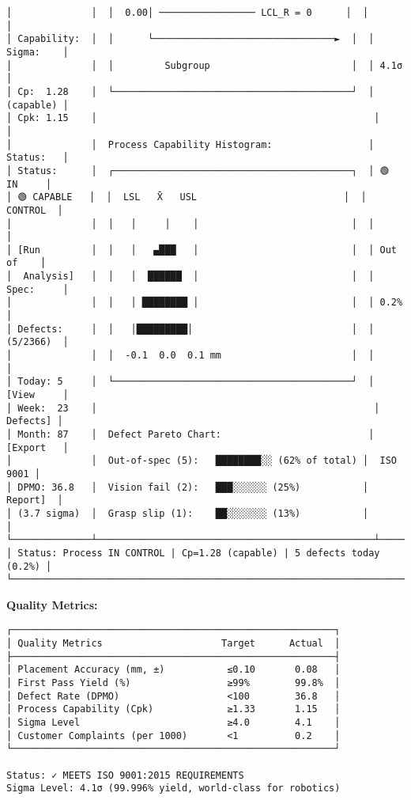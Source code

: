 \documentclass[
]{article}
\begin{document}
\begin{verbatim}
│              │  │  0.00│ ───────────────── LCL_R = 0      │  │           │
│ Capability:  │  │      └────────────────────────────────►  │  │ Sigma:    │
│              │  │         Subgroup                         │  │ 4.1σ      │
│ Cp:  1.28    │  └──────────────────────────────────────────┘  │ (capable) │
│ Cpk: 1.15    │                                                 │           │
│              │  Process Capability Histogram:                 │ Status:   │
│ Status:      │  ┌──────────────────────────────────────────┐  │ 🟢 IN     │
│ 🟢 CAPABLE   │  │  LSL   X̄   USL                          │  │  CONTROL  │
│              │  │   │     │    │                           │  │           │
│ [Run         │  │   │   ▄███   │                           │  │ Out of    │
│  Analysis]   │  │   │  ██████  │                           │  │ Spec:     │
│              │  │   │ ████████ │                           │  │ 0.2%      │
│ Defects:     │  │   │█████████│                            │  │ (5/2366)  │
│              │  │  -0.1  0.0  0.1 mm                       │  │           │
│ Today: 5     │  └──────────────────────────────────────────┘  │ [View     │
│ Week:  23    │                                                 │  Defects] │
│ Month: 87    │  Defect Pareto Chart:                          │ [Export   │
│              │  Out-of-spec (5):   ████████░░ (62% of total) │  ISO 9001 │
│ DPMO: 36.8   │  Vision fail (2):   ███░░░░░░ (25%)           │  Report]  │
│ (3.7 sigma)  │  Grasp slip (1):    ██░░░░░░░ (13%)           │           │
└──────────────┴─────────────────────────────────────────────────┴───────────┘
│ Status: Process IN CONTROL | Cp=1.28 (capable) | 5 defects today (0.2%) │
└────────────────────────────────────────────────────────────────────────────┘
\end{verbatim}

\textbf{Quality Metrics:}

\begin{verbatim}
┌─────────────────────────────────────────────────────────┐
│ Quality Metrics                     Target      Actual  │
├─────────────────────────────────────────────────────────┤
│ Placement Accuracy (mm, ±)           ≤0.10       0.08   │
│ First Pass Yield (%)                 ≥99%        99.8%  │
│ Defect Rate (DPMO)                   <100        36.8   │
│ Process Capability (Cpk)             ≥1.33       1.15   │
│ Sigma Level                          ≥4.0        4.1    │
│ Customer Complaints (per 1000)       <1          0.2    │
└─────────────────────────────────────────────────────────┘

Status: ✓ MEETS ISO 9001:2015 REQUIREMENTS
Sigma Level: 4.1σ (99.996% yield, world-class for robotics)
\end{verbatim}
\end{document}
